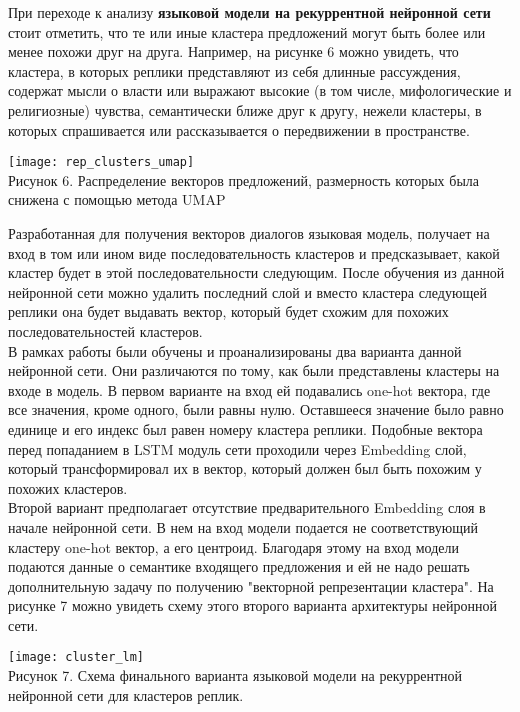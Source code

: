 \documentclass[a4paper,14pt]{article}
\begin{document}
\begin{justify}
\indent
При переходе к анализу \textbf{языковой модели на рекуррентной нейронной сети} стоит отметить, что те или иные кластера предложений могут быть более или менее похожи друг на друга. Например, на рисунке 6 можно увидеть, что кластера, в которых реплики представляют из себя длинные рассуждения, содержат мысли о власти или выражают высокие (в том числе, мифологические и религиозные) чувства, семантически ближе друг к другу, нежели кластеры, в которых спрашивается или рассказывается о передвижении в пространстве.
\begin{center}
	\texttt{[image: rep\_clusters\_umap]} \\
	Рисунок 6. Распределение векторов предложений, размерность которых была снижена с помощью метода UMAP \cite{umap}
\end{center}
\indent
Разработанная для получения векторов диалогов языковая модель, получает на вход в том или ином виде последовательность кластеров и предсказывает, какой кластер будет в этой последовательности следующим. После обучения из данной нейронной сети можно удалить последний слой и вместо кластера следующей реплики она будет выдавать вектор, который будет схожим для похожих последовательностей кластеров. \\
\indent
В рамках работы были обучены и проанализированы два варианта данной нейронной сети. Они различаются по тому, как были представлены кластеры на входе в модель. В первом варианте на вход ей подавались one-hot вектора, где все значения, кроме одного, были равны нулю. Оставшееся значение было равно единице и его индекс был равен номеру кластера реплики. Подобные вектора перед попаданием в LSTM модуль сети проходили через Embedding слой, который трансформировал их в вектор, который должен был быть похожим у похожих кластеров. \\
\indent
Второй вариант предполагает отсутствие предварительного Embedding слоя в начале нейронной сети. В нем на вход модели подается не соответствующий кластеру one-hot вектор, а его центроид. Благодаря этому на вход модели подаются данные о семантике входящего предложения и ей не надо решать дополнительную задачу по получению "векторной репрезентации кластера". На рисунке 7 можно увидеть схему этого второго варианта архитектуры нейронной сети.
\begin{center}
	\texttt{[image: cluster\_lm]} \\
	Рисунок 7. Схема финального варианта языковой модели на рекуррентной нейронной сети для кластеров реплик.
\end{center}

\end{justify}
\end{document}
